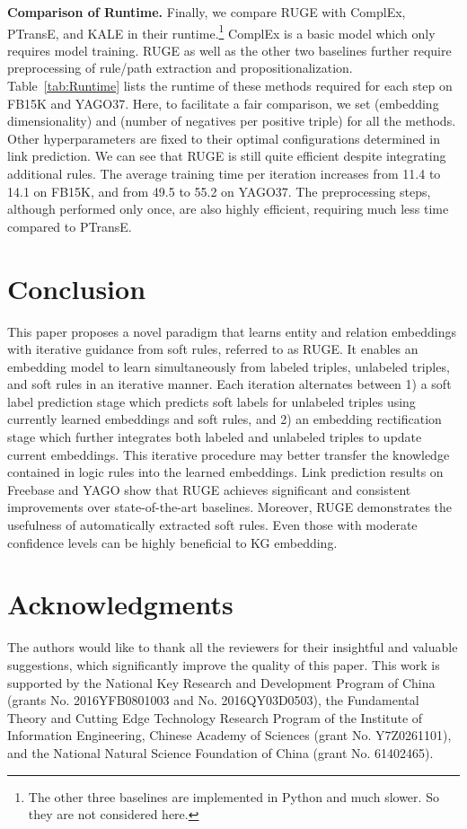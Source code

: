 \documentclass[letterpaper]{article} \usepackage{aaai18}  \usepackage{times}  \usepackage{helvet}  \usepackage{courier}  \usepackage{url}  \usepackage{graphicx}  \usepackage{amsmath}
\begin{document}
\smallskip
\noindent\textbf{Comparison of Runtime.} Finally, we compare RUGE with ComplEx, PTransE, and KALE in their runtime.\footnote{The other three baselines are implemented in Python and much slower. So they are not considered here.} ComplEx is a basic model which only requires model training. RUGE as well as the other two baselines further require preprocessing of rule/path extraction and propositionalization. Table~\ref{tab:Runtime} lists the runtime of these methods required for each step on FB15K and YAGO37. Here, to facilitate a fair comparison, we set  (embedding dimensionality) and  (number of negatives per positive triple) for all the methods. Other hyperparameters are fixed to their optimal configurations determined in link prediction. We can see that RUGE is still quite efficient despite integrating additional rules. The average training time per iteration increases from 11.4 to 14.1 on FB15K, and from 49.5 to 55.2 on YAGO37. The preprocessing steps, although performed only once, are also highly efficient, requiring much less time compared to PTransE.

\section{Conclusion}
This paper proposes a novel paradigm that learns entity and relation embeddings with iterative guidance from soft rules, referred to as RUGE. It enables an embedding model to learn simultaneously from labeled triples, unlabeled triples, and soft rules in an iterative manner. Each iteration alternates between 1) a soft label prediction stage which predicts soft labels for unlabeled triples using currently learned embeddings and soft rules, and 2) an embedding rectification stage which further integrates both labeled and unlabeled triples to update current embeddings. This iterative procedure may better transfer the knowledge contained in logic rules into the learned embeddings. Link prediction results on Freebase and YAGO show that RUGE achieves significant and consistent improvements over state-of-the-art baselines. Moreover, RUGE demonstrates the usefulness of automatically extracted soft rules. Even those with moderate confidence levels can be highly beneficial to KG embedding.

\section*{Acknowledgments}
The authors would like to thank all the reviewers for their insightful and valuable suggestions, which significantly improve the quality of this paper. This work is supported by the National Key Research and Development Program of China (grants No. 2016YFB0801003 and No. 2016QY03D0503), the Fundamental Theory and Cutting Edge Technology Research Program of the Institute of Information Engineering, Chinese Academy of Sciences (grant No. Y7Z0261101), and the National Natural Science Foundation of China (grant No. 61402465).
\end{document}
